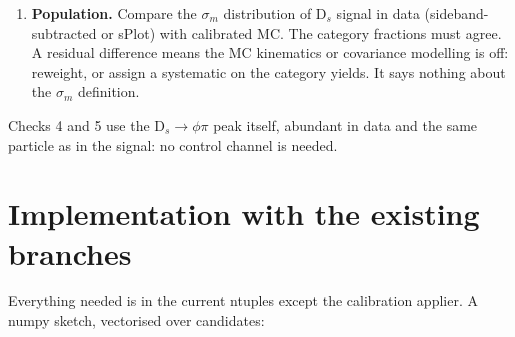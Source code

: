 \documentclass[11pt,a4paper]{article}
\begin{document}
\begin{enumerate}[label=\textbf{\arabic*.}]
\begin{itemize}
          \item Plot the fitted width against $\langle\sigma_m\rangle$ in the bin: data and calibrated MC should
                lie on the same line, ideally of slope 1 through the origin.
          \item Quote the per-category data/MC width ratio. It should be 1 within its error; otherwise it
                becomes a per-category resolution correction.
        \end{itemize}
  \item \textbf{Population.} Compare the $\sigma_m$ distribution of D$_s$ signal in data (sideband-subtracted or
        sPlot) with calibrated MC. The category fractions must agree. A residual difference means the MC
        kinematics or covariance modelling is off: reweight, or assign a systematic on the category yields.
        It says nothing about the $\sigma_m$ definition.
\end{enumerate}

Checks 4 and 5 use the D$_s\to\phi\pi$ peak itself, abundant in data and the same particle as in the signal:
no control channel is needed.

\section{Implementation with the existing branches}

Everything needed is in the current ntuples except the calibration applier. A numpy sketch, vectorised over
candidates:
\end{document}
